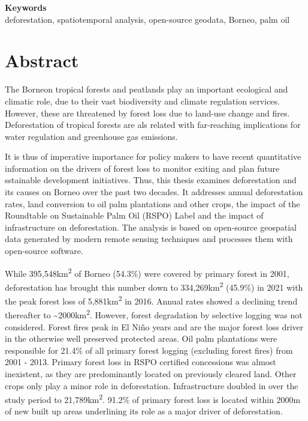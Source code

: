 \documentclass[
  letterpaper,
  DIV=11,
  numbers=noendperiod]{scrreprt}
\begin{document}
\noindent\textbf{Keywords}\\
deforestation, spatiotemporal analysis, open-source geodata, Borneo, palm oil

\ifdefined\Shaded\renewenvironment{Shaded}{\begin{tcolorbox}[sharp corners, frame hidden, interior hidden, borderline west={3pt}{0pt}{shadecolor}, enhanced, boxrule=0pt, breakable]}{\end{tcolorbox}}\fi


\hypertarget{abstract}{%
\chapter*{Abstract}\label{abstract}}


The Borneon tropical forests and peatlands play an important ecological
and climatic role, due to their vast biodiversity and climate regulation
services. However, these are threatened by forest loss due to land-use
change and fires. Deforestation of tropical forests are als related with
far-reaching implications for water regulation and greenhouse gas
emissions.

It is thus of imperative importance for policy makers to have recent
quantitative information on the drivers of forest loss to monitor
exiting and plan future sstainable development initiatives. Thus, this
thesis examines deforestation and its causes on Borneo over the past two
decades. It addresses annual deforestation rates, land conversion to oil
palm plantations and other crops, the impact of the Roundtable on
Sustainable Palm Oil (RSPO) Label and the impact of infrastructure on
deforestation. The analysis is based on open-source geospatial data
generated by modern remote sensing techniques and processes them with
open-source software.

While 395,548km\textsuperscript{2} of Borneo (54.3\%) were covered by
primary forest in 2001, deforestation has brought this number down to
334,269km\textsuperscript{2} (45.9\%) in 2021 with the peak forest loss
of 5,881km\textsuperscript{2} in 2016. Annual rates showed a declining
trend thereafter to \textasciitilde2000km\textsuperscript{2}. However,
forest degradation by selective logging was not considered. Forest fires
peak in El Niño years and are the major forest loss driver in the
otherwise well preserved protected areas. Oil palm plantations were
responsible for 21.4\% of all primary forest logging (excluding forest
fires) from 2001 - 2013. Primary forest loss in RSPO certified
concessions was almost inexistent, as they are predominantly located on
previously cleared land. Other crops only play a minor role in
deforestation. Infrastructure doubled in over the study period to
21,789km\textsuperscript{2}. 91.2\% of primary forest loss is located
within 2000m of new built up areas underlining its role as a major
driver of deforestation.
\end{document}

